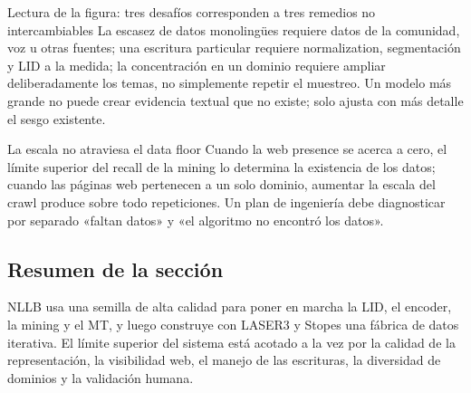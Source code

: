 
\begin{knowledgebox}{Lectura de la figura: tres desafíos corresponden a tres remedios no intercambiables}
La escasez de datos monolingües requiere datos de la comunidad, voz u otras fuentes; una escritura particular requiere normalization, segmentación y LID a la medida; la concentración en un dominio requiere ampliar deliberadamente los temas, no simplemente repetir el muestreo. Un modelo más grande no puede crear evidencia textual que no existe; solo ajusta con más detalle el sesgo existente.
\end{knowledgebox}

\begin{warningbox}{La escala no atraviesa el data floor}
Cuando la web presence se acerca a cero, el límite superior del recall de la mining lo determina la existencia de los datos; cuando las páginas web pertenecen a un solo dominio, aumentar la escala del crawl produce sobre todo repeticiones. Un plan de ingeniería debe diagnosticar por separado «faltan datos» y «el algoritmo no encontró los datos».
\end{warningbox}


\subsection{Resumen de la sección}

NLLB usa una semilla de alta calidad para poner en marcha la LID, el encoder, la mining y el MT, y luego construye con LASER3 y Stopes una fábrica de datos iterativa. El límite superior del sistema está acotado a la vez por la calidad de la representación, la visibilidad web, el manejo de las escrituras, la diversidad de dominios y la validación humana.
